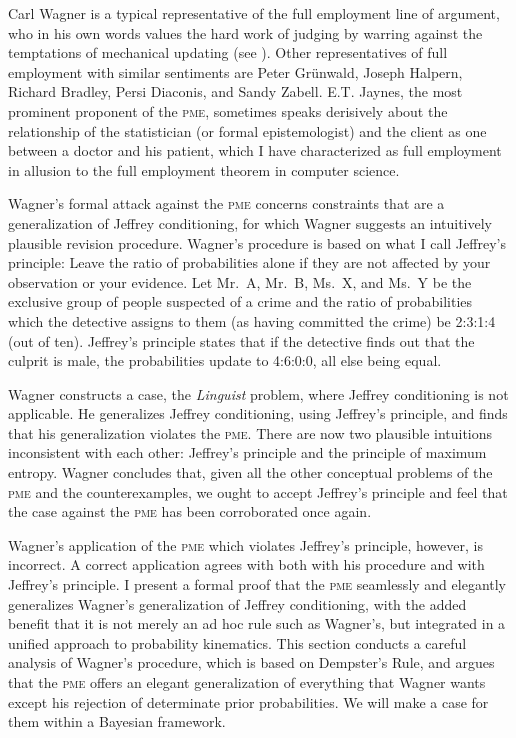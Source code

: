 \documentclass[11pt]{article}
\begin{document}
Carl Wagner is a typical representative of the full employment line of
argument, who in his own words values the hard work of judging by
warring against the temptations of mechanical updating (see
). Other representatives of full employment
with similar sentiments are Peter Gr{\"u}nwald, Joseph Halpern,
Richard Bradley, Persi Diaconis, and Sandy Zabell. E.T. Jaynes, the
most prominent proponent of the \textsc{pme}, sometimes speaks
derisively about the relationship of the statistician (or formal
epistemologist) and the client as one between a doctor and his
patient, which I have characterized as full employment in allusion to
the full employment theorem in computer science.

Wagner's formal attack against the \textsc{pme} concerns constraints
that are a generalization of Jeffrey conditioning, for which Wagner
suggests an intuitively plausible revision procedure. Wagner's
procedure is based on what I call Jeffrey's principle: Leave the ratio
of probabilities alone if they are not affected by your observation or
your evidence. Let Mr.\ A, Mr.\ B, Ms.\ X, and Ms.\ Y be the exclusive
group of people suspected of a crime and the ratio of probabilities
which the detective assigns to them (as having committed the crime) be
2:3:1:4 (out of ten). Jeffrey's principle states that if the detective
finds out that the culprit is male, the probabilities update to
4:6:0:0, all else being equal.

Wagner constructs a case, the \emph{Linguist} problem, where Jeffrey
conditioning is not applicable. He generalizes Jeffrey conditioning,
using Jeffrey's principle, and finds that his generalization violates
the \textsc{pme}. There are now two plausible intuitions inconsistent
with each other: Jeffrey's principle and the principle of maximum
entropy. Wagner concludes that, given all the other conceptual
problems of the \textsc{pme} and the counterexamples, we ought to
accept Jeffrey's principle and feel that the case against the
\textsc{pme} has been corroborated once again.

Wagner's application of the \textsc{pme} which violates Jeffrey's
principle, however, is incorrect. A correct application agrees with
both with his procedure and with Jeffrey's principle. I present a
formal proof that the \textsc{pme} seamlessly and elegantly
generalizes Wagner's generalization of Jeffrey conditioning, with the
added benefit that it is not merely an ad hoc rule such as Wagner's,
but integrated in a unified approach to probability kinematics. This
section conducts a careful analysis of Wagner's procedure, which is
based on Dempster's Rule, and argues that the \textsc{pme} offers an
elegant generalization of everything that Wagner wants except his
rejection of determinate prior probabilities. We will make a case for
them within a Bayesian framework.
\end{document}
